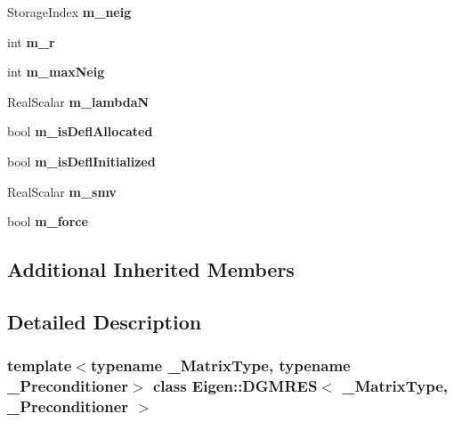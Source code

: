 \begin{DoxyCompactItemize}
Storage\+Index {\bfseries m\+\_\+neig}
\item 
\mbox{\label{class_eigen_1_1_d_g_m_r_e_s_ab9f78023b15e26c3bc3ccca110017f66}} 
int {\bfseries m\+\_\+r}
\item 
\mbox{\label{class_eigen_1_1_d_g_m_r_e_s_a76f9ebf24cf2a2bd8c315ba12198a184}} 
int {\bfseries m\+\_\+max\+Neig}
\item 
\mbox{\label{class_eigen_1_1_d_g_m_r_e_s_a1df5e45bd1aeef2c34a0d4777fd3f95b}} 
Real\+Scalar {\bfseries m\+\_\+lambdaN}
\item 
\mbox{\label{class_eigen_1_1_d_g_m_r_e_s_a38beee7707cc020cb666061bdd7c6f7e}} 
bool {\bfseries m\+\_\+is\+Defl\+Allocated}
\item 
\mbox{\label{class_eigen_1_1_d_g_m_r_e_s_afc8a3fc0175e8a0905cb6870703ef2f9}} 
bool {\bfseries m\+\_\+is\+Defl\+Initialized}
\item 
\mbox{\label{class_eigen_1_1_d_g_m_r_e_s_abb458f4403c029af772bfe4ff13843e4}} 
Real\+Scalar {\bfseries m\+\_\+smv}
\item 
\mbox{\label{class_eigen_1_1_d_g_m_r_e_s_a168ad0062ed979171817bf7cce9d6a64}} 
bool {\bfseries m\+\_\+force}
\end{DoxyCompactItemize}
\subsection*{Additional Inherited Members}


\subsection{Detailed Description}
\subsubsection*{template$<$typename \+\_\+\+Matrix\+Type, typename \+\_\+\+Preconditioner$>$\newline
class Eigen\+::\+D\+G\+M\+R\+E\+S$<$ \+\_\+\+Matrix\+Type, \+\_\+\+Preconditioner $>$}

